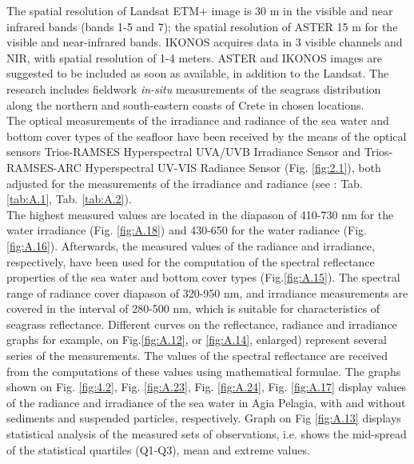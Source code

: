 \documentclass[11pt]{article}
\begin{document}
The spatial resolution of \ac{Landsat ETM+} image is 30 m in the visible and near infrared bands (bands
1-5 and 7); the spatial resolution of \ac{ASTER} 15 m for the visible and near-infrared bands. IKONOS
acquires data in 3 visible channels and \ac{NIR}, with spatial resolution of 1-4 meters. \ac{ASTER} and
IKONOS images are suggested to be included as soon as available, in addition to the Landsat. The
research includes fieldwork \textit{in-situ} measurements of the seagrass distribution along the northern and
south-eastern coasts of Crete in chosen locations.\\
The optical measurements of the irradiance and radiance of the sea water and bottom cover types of
the seafloor have been received by the means of the optical sensors \ac{Trios-RAMSES} Hyperspectral
UVA/UVB Irradiance Sensor and \ac{Trios-RAMSES}-ARC Hyperspectral UV-VIS Radiance Sensor (Fig. \ref{fig:2.1}), both adjusted for the measurements of the irradiance and radiance (see : Tab. \ref{tab:A.1}, Tab. \ref{tab:A.2}). \\
The highest measured values are located in the diapason of 410-730 nm for the water irradiance (Fig. \ref{fig:A.18}) and 430-650 for the water radiance (Fig.\ref{fig:A.16}). 
Afterwards, the measured values of the radiance and irradiance, respectively, have been used for the computation of the spectral reflectance
properties of the sea water and bottom cover types (Fig.\ref{fig:A.15}). The spectral range of radiance
cover diapason of 320-950 nm, and irradiance measurements are covered in the interval of 280-500
nm, which is suitable for characteristics of seagrass reflectance.
Different curves on the reflectance, radiance and irradiance graphs for example, on Fig.\ref{fig:A.12}, or \ref{fig:A.14}, enlarged) represent several series of
the measurements. The values of the spectral reflectance are received from the
computations of these values using mathematical formulae. The graphs shown on Fig. \ref{fig:4.2}, Fig. \ref{fig:A.23}, Fig. \ref{fig:A.24}, Fig. \ref{fig:A.17} display values of the radiance and irradiance of the sea water in Agia Pelagia, with and without sediments and suspended particles, respectively. Graph on Fig \ref{fig:A.13} displays statistical analysis of the measured sets of observations, i.e. shows the mid-spread of the statistical quartiles (Q1-Q3), mean and extreme values.

%
\end{document}
